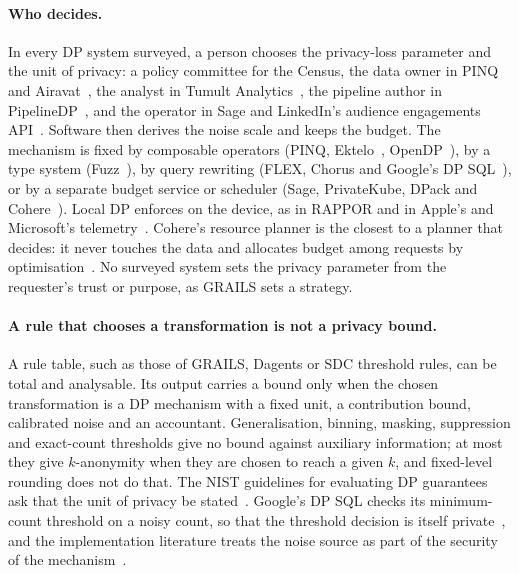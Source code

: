 \paragraph{Who decides.} In every DP system surveyed, a person chooses the
privacy-loss parameter and the unit of privacy: a policy committee for the
Census, the data owner in PINQ and Airavat~\citep{mcsherry2009privacy,roy2010airavat},
the analyst in Tumult Analytics~\citep{berghel2022tumult}, the pipeline author
in PipelineDP~\citep{pipelinedp2026}, and the operator in Sage and LinkedIn's
audience engagements API~\citep{lecuyer2019privacy,rogers2021linkedin}. Software
then derives the noise scale and keeps the budget. The mechanism is fixed by
composable operators (PINQ, Ektelo~\citep{zhang2018ektelo},
OpenDP~\citep{opendp2026library}), by a type system
(Fuzz~\citep{reed2010distance}), by query rewriting
(FLEX, Chorus and Google's DP SQL~\citep{johnson2018towards,johnson2020chorus,wilson2020differentially}),
or by a separate budget service or scheduler (Sage, PrivateKube, DPack and
Cohere~\citep{lecuyer2019privacy,luo2021privacy,tholoniat2025dpack,kuchler2024cohere}).
Local DP enforces on the device, as in RAPPOR and in Apple's and Microsoft's
telemetry~\citep{erlingsson2014rappor,apple2017learning,ding2017collecting}.
Cohere's resource planner is the closest to a planner that decides: it never
touches the data and allocates budget among requests by
optimisation~\citep{kuchler2024cohere}. No surveyed system sets the privacy
parameter from the requester's trust or purpose, as GRAILS sets a strategy.

\paragraph{A rule that chooses a transformation is not a privacy bound.} A rule
table, such as those of GRAILS, Dagents or SDC threshold rules, can be total
and analysable. Its output carries a bound only when the chosen transformation
is a DP mechanism with a fixed unit, a contribution bound, calibrated noise and
an accountant. Generalisation, binning, masking, suppression and exact-count
thresholds give no bound against auxiliary information; at most they give
\(k\)-anonymity when they are chosen to reach a given \(k\), and fixed-level
rounding does not do that. The NIST guidelines for evaluating DP guarantees ask
that the unit of privacy be stated~\citep{near2025guidelines}. Google's DP SQL
checks its minimum-count threshold on a noisy count, so that the threshold
decision is itself private~\citep[\S3.5]{wilson2020differentially}, and the
implementation literature treats the noise source as part of the security of
the mechanism~\citep{mironov2012significance}.

